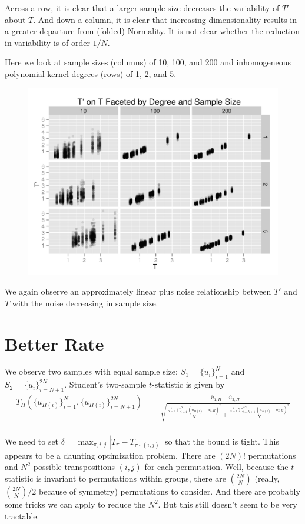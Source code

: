 Across a row, it is clear that a larger sample size decreases the
variability of $T'$ about $T$.  And down a column, it is clear that
increasing dimensionality results in a greater departure from (folded)
Normality.  It is not clear whether the reduction in variability is of
order $1/N$.
\clearpage

Here we look at sample sizes (columns) of 10, 100, and 200 and
inhomogeneous polynomial kernel degrees (rows) of 1, 2, and 5.
\begin{figure}[!ht]
  \centering
  \includegraphics{./simulations/ARC/poly_ker_ARC.png}
\end{figure}

We again observe an approximately linear plus noise relationship
between $T'$ and $T$ with the noise decreasing in sample size.  

\section{Better Rate}
We observe two samples with equal sample size: $S_1 = \{u_i\}_{i=1}^N$ and $S_2 =
\{u_i\}_{i=N+1}^{2N}$.  
Student's two-sample $t$-statistic is given by
\begin{align*}
T_{\Pi}(\{u_{\Pi(i)}\}_{i=1}^N, \{u_{\Pi(i)}\}_{i=N+1}^{2N}) 
&= \frac{\bar{u}_{1,\Pi} - \bar{u}_{2,\Pi}}{\sqrt{\frac{\frac{1}{N-1}
      \sum_{i=1}^N(u_{\Pi(i)} - \bar{u}_{1,\Pi})^2}{N} + \frac{\frac{1}{N-1}
      \sum_{i=N+1}^{2N}(u_{\Pi(i)} - \bar{u}_{2,\Pi})^2}{N}}} \\
\end{align*}

We need to set $\delta = \max_{\pi, i, j} |T_{\pi} - T_{\pi \circ (i, j)}|$ 
so that the bound is tight.  This appears to be a daunting
optimization problem.  There are $(2N)!$ permutations and $N^2$
possible transpositions $(i, j)$ for each permutation.  Well, because the
$t$-statistic is invariant to permutations within groups, there are
$\binom{2N}{N}$ (really, $\binom{2N}{N} / 2$ because of symmetry)
permutations to consider.  And there are probably some tricks we can
apply to reduce the $N^2$.  But this still doesn't seem to be very
tractable.

